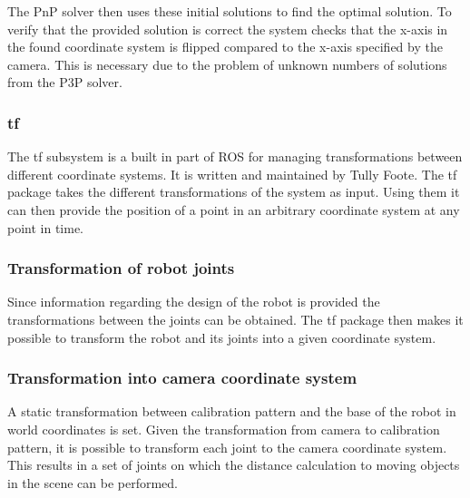 The PnP solver then uses these initial solutions to find the optimal solution.
To verify that the provided solution is correct the system checks that the x-axis in the found coordinate system is flipped compared to the x-axis specified by the camera.
This is necessary due to the problem of unknown numbers of solutions from the P3P solver.


\subsubsection{tf}
The tf subsystem is a built in part of ROS for managing transformations between different coordinate systems. It is written and maintained by Tully Foote. The tf package takes the different transformations of the system as input. Using them it can then provide the position of a point in an arbitrary coordinate system at any point in time.

\subsubsection{Transformation of robot joints}
Since information regarding the design of the robot is provided the transformations between the joints can be obtained. The tf package then makes it possible to transform the robot and its joints into a given coordinate system.

\subsubsection{Transformation into camera coordinate system}
A static transformation between calibration pattern and the base of the robot in world coordinates is set. Given the transformation from camera to calibration pattern, it is possible to transform each joint to the camera coordinate system. This results in a set of joints on which the distance calculation to moving objects in the scene can be performed. 
